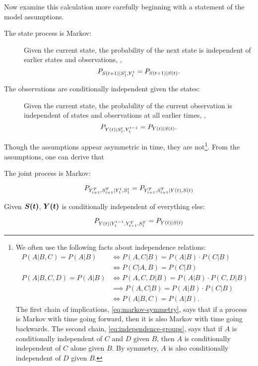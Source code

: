 Now examine this calculation more carefully beginning with a statement
of the model assumptions.
\begin{description}
\item[The state process is Markov:] Given the current state, the
  probability of the next state is independent of earlier states and
  observations, \ie,
  \begin{equation}
    \label{eq:assume_markov}
    P_{\ti{S}{t+1}|\ts{S}{1}{t},\ts{Y}{1}{t}} = %
        P_{\ti{S}{t+1}|\ti{S}{t}}.
  \end{equation}
\item[The observations are conditionally independent given the states:]
  Given the current state, the probability of the current observation is
  independent of states and observations at all earlier times, \ie,
  \begin{equation}
    \label{eq:assume_output}
    P_{\ti{Y}{t}|\ts{S}{1}{t},\ts{Y}{1}{t-1}} = %
        P_{\ti{Y}{t}|\ti{S}{t}}.
  \end{equation}
\end{description}
Though the assumptions appear asymmetric in time, they are
not\footnote{We often use the following facts about independence
  relations:
  \begin{align}
    P(A|B,C) = P(A|B)   &\iff     P(A,C|B) = P(A|B) \cdot P(C|B)\nonumber\\
    \label{eq:markov-symmetry}%
                        &\iff     P(C|A,B) = P(C|B)\\
    P(A|B,C,D) = P(A|B) &\iff     P(A,C,D|B) = P(A|B) \cdot P(C,D|B)\nonumber\\
                        &\implies P(A,C|B) = P(A|B) \cdot P(C|B)\nonumber\\
    \label{eq:independence-groups}%
                        &\iff     P(A|B,C) = P(A|B).
  \end{align}
  The first chain of implications, \eqref{eq:markov-symmetry}, says
  that if a process is Markov with time going forward, then it is also
  Markov with time going backwards.  The second chain,
  \eqref{eq:independence-groups}, says that if $A$ is conditionally
  independent of $C$ and $D$ given $B$, then $A$ is conditionally
  independent of $C$ alone given $B$.  By symmetry, $A$ is also
  conditionally independent of $D$ given $B$.}.  From the assumptions,
one can derive that
\begin{description}
\item[The joint process is Markov:] 
  \begin{equation*}
    P_{Y_{t+1}^{T},S_{t+1}^{T}|Y_{1}^{t},S_{1}^{t}}
      = P_{Y_{t+1}^{T},S_{t+1}^{T}|{Y}{(t)},{S}{(t)}}
  \end{equation*}
\item[Given $\bm{{S}{(t)}}$, $\bm{{Y}{(t)}}$ is conditionally independent of everything else:]
  \begin{equation*}
    P_{{Y}{(t)} |Y_{1}^{t-1},Y_{t+1}^{T}, S_{1}^{T}} = P_{{Y}{(t)} |{S}{(t)}}
  \end{equation*}
\end{description}
